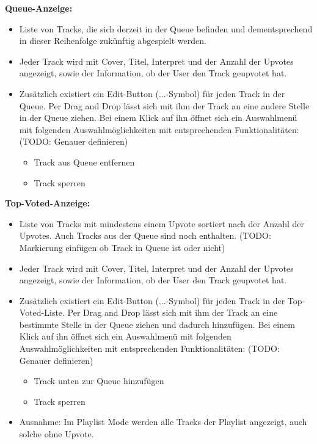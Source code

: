 \documentclass[oneside, ngerman]{sdqtechreport}
\begin{document}
\textbf{Queue-Anzeige:}
\begin{itemize}
    \item Liste von Tracks, die sich derzeit in der Queue befinden und dementsprechend in dieser Reihenfolge zukünftig abgespielt werden.
    \item Jeder Track wird mit Cover, Titel, Interpret und der Anzahl der Upvotes angezeigt, sowie der Information, ob der User den Track geupvotet hat.
    \item Zusätzlich existiert ein Edit-Button (...-Symbol) für jeden Track in der Queue. Per Drag and Drop lässt sich mit ihm der Track an eine andere Stelle in der Queue ziehen. Bei einem Klick auf ihn öffnet sich ein Auswahlmenü mit folgenden Auswahlmöglichkeiten mit entsprechenden Funktionalitäten: (TODO: Genauer definieren)
    \begin{itemize}
        \item Track aus Queue entfernen
        \item Track sperren
    \end{itemize}
\end{itemize}

\textbf{Top-Voted-Anzeige:}
\begin{itemize}
    \item Liste von Tracks mit mindestens einem Upvote sortiert nach der Anzahl der Upvotes. Auch Tracks aus der Queue sind noch enthalten. (TODO: Markierung einfügen ob Track in Queue ist oder nicht)
    \item Jeder Track wird mit Cover, Titel, Interpret und der Anzahl der Upvotes angezeigt, sowie der Information, ob der User den Track geupvotet hat.
    \item Zusätzlich existiert ein Edit-Button (...-Symbol) für jeden Track in der Top-Voted-Liste. Per Drag and Drop lässt sich mit ihm der Track an eine bestimmte Stelle in der Queue ziehen und dadurch hinzufügen. Bei einem Klick auf ihn öffnet sich ein Auswahlmenü mit folgenden Auswahlmöglichkeiten mit entsprechenden Funktionalitäten: (TODO: Genauer definieren)
    \begin{itemize}
        \item Track unten zur Queue hinzufügen
        \item Track sperren
    \end{itemize}
    \item Ausnahme: Im Playlist Mode werden alle Tracks der Playlist angezeigt, auch solche ohne Upvote.
\end{itemize}
\end{document}
